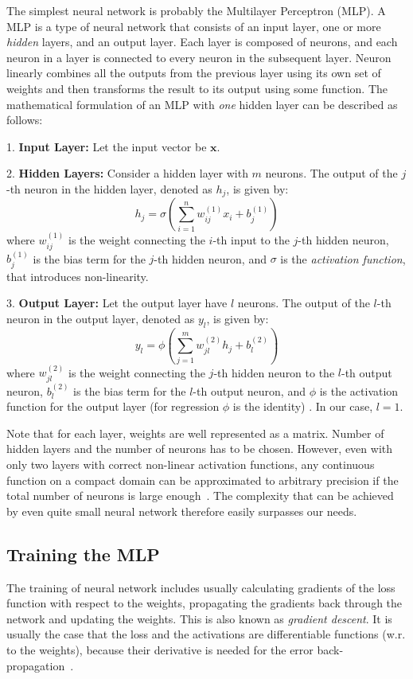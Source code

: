 The simplest neural network is probably the  Multilayer Perceptron (MLP). A MLP is a type of neural network that consists of an input layer, one or more \textit{hidden} layers, and an output layer. Each layer is composed of neurons, and each neuron in a layer is connected to every neuron in the subsequent layer. Neuron linearly combines all the outputs from the previous layer using its own set of weights and then transforms the result to its output using some function. The mathematical formulation of an MLP with \textit{one} hidden layer can be described as follows:

1. \textbf{Input Layer:} Let the input vector be $\bm{x}$.

2. \textbf{Hidden Layers:} Consider a hidden layer with $m$ neurons. The output of the $j$-th neuron in the hidden layer, denoted as $h_j$, is given by:
\begin{equation}
	h_j = \sigma\left( \sum_{i=1}^{n} w_{ij}^{(1)} x_i + b_j^{(1)} \right)
\end{equation}
where $w_{ij}^{(1)}$ is the weight connecting the $i$-th input to the $j$-th hidden neuron, $b_j^{(1)}$ is the bias term for the $j$-th hidden neuron, and $\sigma$ is the \textit{activation function}, that introduces non-linearity.

3. \textbf{Output Layer:} Let the output layer have $l$ neurons. The output of the $l$-th neuron in the output layer, denoted as $y_l$, is given by:
\begin{equation}
	y_l = \phi\left( \sum_{j=1}^{m} w_{jl}^{(2)} h_j + b_l^{(2)} \right)
\end{equation}
where $w_{jl}^{(2)}$ is the weight connecting the $j$-th hidden neuron to the $l$-th output neuron, $b_l^{(2)}$ is the bias term for the $l$-th output neuron, and $\phi$ is the activation function for the output layer (for regression $\phi$ is the identity) \cite{bishop2006}. In our case, $l=1$.

Note that for each layer, weights are well represented as a matrix. Number of hidden layers and the number of neurons has to be chosen. However, even with only two layers with correct non-linear activation functions, any continuous function on a compact domain can be approximated to arbitrary precision if the total number of neurons is large enough~\cite{bishop2006}. The complexity that can be achieved by even quite small neural network therefore easily surpasses our needs.

\subsection*{Training the MLP}
The training of neural network includes usually calculating gradients of the loss function with respect to the weights, propagating the gradients back through the network and updating the weights. This is also known as \textit{gradient descent}. It is usually the case that the loss and the activations are differentiable functions (w.r. to the weights), because their derivative is needed for the error back-propagation~\cite{bishop2006}.

